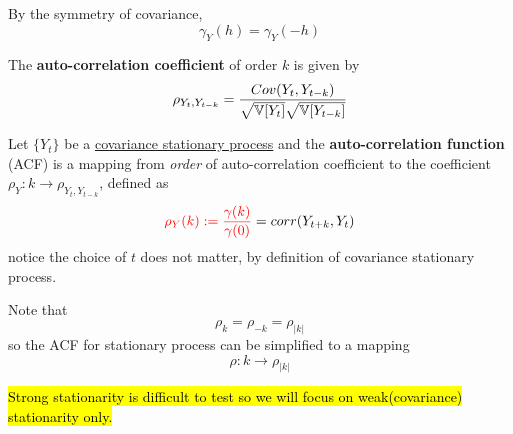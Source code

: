\documentclass[11pt]{article}
\begin{document}
		\begin{proposition}
			By the symmetry of covariance, 
			\begin{equation}
				\gamma_Y(h) = \gamma_Y(-h)
			\end{equation}
		\end{proposition}
		
		\begin{definition}
			The \textbf{auto-correlation coefficient} of order $k$ is given by
			\begin{equation}
				\rho_{Y_t, Y_{t-k}} = \frac{Cov(Y_t, Y_{t-k})}{\sqrt{\mathbb{V}[{Y_t}]}\sqrt{\mathbb{V}[{Y_{t-k}}]}}
			\end{equation}
		\end{definition}
		
		\begin{definition}
			Let $\{Y_t\}$ be a \ul{covariance stationary process} and the \textbf{auto-correlation function} (ACF) is a mapping from \emph{order} of auto-correlation coefficient to the coefficient $\rho_Y: k \to \rho_{Y_t, Y_{t-k}}$, defined as
			\begin{equation}
				\textcolor{red}{\rho_Y(k) := \frac{\gamma(k)}{\gamma(0)}} = corr(Y_{t + k}, Y_t)
			\end{equation}
			notice the choice of $t$ does not matter, by definition of covariance stationary process.
		\end{definition}
		
		\begin{proposition}
			Note that 
			\begin{equation}
				\rho_k = \rho_{-k} = \rho_{|k|}
			\end{equation}
			so the ACF for stationary process can be simplified to a mapping 
			\begin{equation}
				\rho: k \to \rho_{|k|}
			\end{equation}
		\end{proposition}
		
		\begin{remark}
			\hl{Strong stationarity is difficult to test so we will focus on weak(covariance) stationarity only.}
		\end{remark}
		
\end{document}
